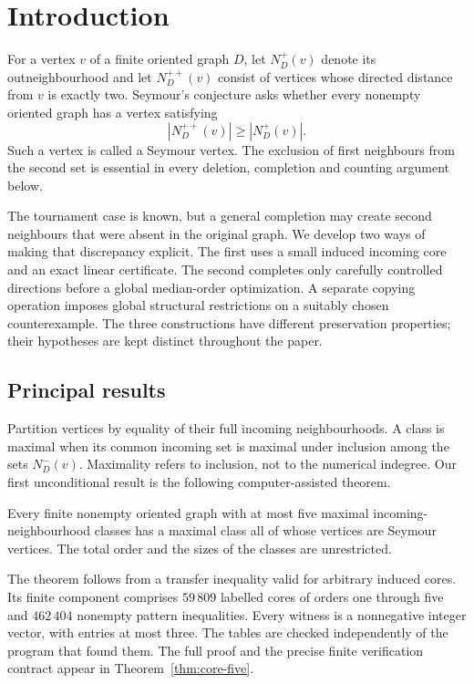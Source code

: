 \section{Introduction}
For a vertex $v$ of a finite oriented graph $D$, let $N_D^+(v)$ denote its
outneighbourhood and let $N_D^{++}(v)$ consist of vertices whose directed
distance from $v$ is exactly two. Seymour's conjecture asks whether every
nonempty oriented graph has a vertex satisfying
\begin{equation}\label{eq:paper-snc}
 |N_D^{++}(v)|\ge |N_D^+(v)|.
\end{equation}
Such a vertex is called a Seymour vertex. The exclusion of first neighbours
from the second set is essential in every deletion, completion and counting
argument below.

The tournament case is known, but a general completion may create second
neighbours that were absent in the original graph. We develop two ways of
making that discrepancy explicit. The first uses a small induced incoming
core and an exact linear certificate. The second completes only carefully
controlled directions before a global median-order optimization. A separate
copying operation imposes global structural restrictions on a suitably chosen
counterexample. The three constructions have different preservation properties;
their hypotheses are kept distinct throughout the paper.

\subsection{Principal results}
Partition vertices by equality of their full incoming neighbourhoods. A class
is maximal when its common incoming set is maximal under inclusion among the
sets $N_D^-(v)$. Maximality refers to inclusion, not to the numerical indegree.
Our first unconditional result is the following computer-assisted theorem.

\begin{theorem}\label{thm:intro-five}
Every finite nonempty oriented graph with at most five maximal incoming-neighbourhood
classes has a maximal class all of whose vertices are Seymour vertices.
The total order and the sizes of the classes are unrestricted.
\end{theorem}

The theorem follows from a transfer inequality valid for arbitrary induced
cores. Its finite component comprises $59\,809$ labelled cores of orders one
through five and $462\,404$ nonempty pattern inequalities. Every witness is a
nonnegative integer vector, with entries at most three. The tables are checked
independently of the program that found them. The full proof and the precise
finite verification contract appear in Theorem~\ref{thm:core-five}.

